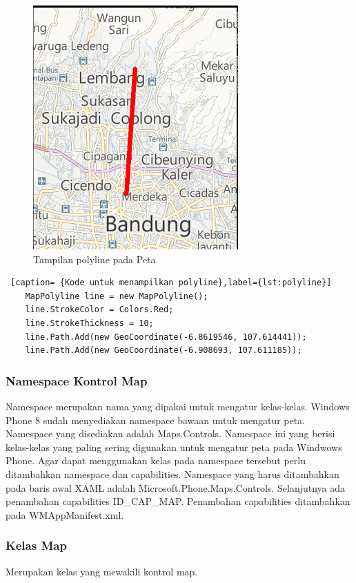 \begin{figure}[h]
	\centering
		\includegraphics[scale=0.5]{Gambar/kontrol/polyline}
	\caption{Tampilan polyline pada Peta}
	\label{fig:TampilanpolylinepadaPeta}
\end{figure}

\begin{lstlisting} [caption= {Kode untuk menampilkan polyline},label={lst:polyline}]
	MapPolyline line = new MapPolyline();
	line.StrokeColor = Colors.Red;
	line.StrokeThickness = 10;
	line.Path.Add(new GeoCoordinate(-6.8619546, 107.614441));
	line.Path.Add(new GeoCoordinate(-6.908693, 107.611185));
\end{lstlisting}

\subsubsection{Namespace Kontrol Map}
\label{subsubsec:Namespace Kontrol Map}
\hspace{0.5cm} Namespace merupakan nama yang dipakai untuk mengatur kelas-kelas. Windows Phone 8 sudah menyediakan namespace bawaan untuk mengatur peta. Namespace yang disediakan adalah Maps.Controls. Namespace ini yang berisi kelas-kelas yang paling sering digunakan untuk mengatur peta pada Windwows Phone.  Agar dapat menggunakan kelas pada namespace tersebut perlu ditambahkan namespace dan capabilities. Namespace yang harus ditambahkan pada baris awal XAML adalah Microsoft.Phone.Maps.Controls. Selanjutnya ada penambahan capabilities ID\_CAP\_MAP. Penambahan capabilities ditambahkan pada WMAppManifest.xml.

\subsubsection{Kelas Map}
\label{subsubsec:Kelas Map}
\hspace{0.5cm} Merupakan kelas yang mewakili kontrol map.

